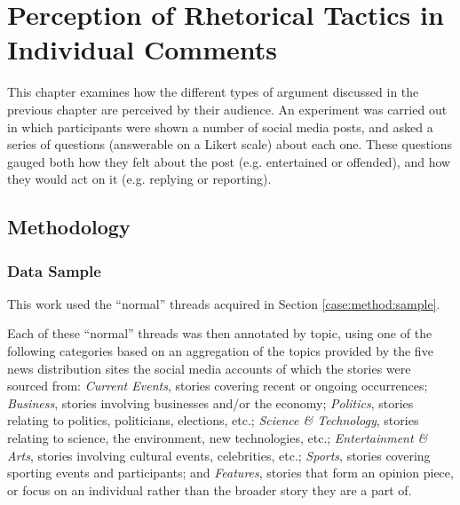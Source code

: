 \chapter{Perception of Rhetorical Tactics in Individual Comments}
\label{perception}

This chapter examines how the different types of argument discussed in the previous chapter are perceived by their audience. An experiment was carried out in which participants were shown a number of social media posts, and asked a series of questions (answerable on a Likert scale) about each one. These questions gauged both how they felt about the post (e.g. entertained or offended), and how they would act on it (e.g. replying or reporting).


\section{Methodology}

\subsection{Data Sample}
\label{perception:method:sample}

This work used the ``normal'' threads acquired in Section \ref{case:method:sample}.

Each of these ``normal'' threads was then annotated by topic, using one of the following categories based on an aggregation of the topics provided by the five news distribution sites the social media accounts of which the stories were sourced from:
\textit{Current Events}, stories covering recent or ongoing occurrences;
\textit{Business}, stories involving businesses and/or the economy;
\textit{Politics}, stories relating to politics, politicians, elections, etc.;
\textit{Science \& Technology}, stories relating to science, the environment, new technologies, etc.;
\textit{Entertainment \& Arts}, stories involving cultural events, celebrities, etc.;
\textit{Sports}, stories covering sporting events and participants;
and \textit{Features}, stories that form an opinion piece, or focus on an individual rather than the broader story they are a part of.


